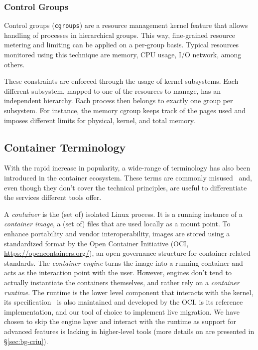 \subsubsection*{Control Groups}

Control groups (\texttt{cgroups}) are a resource management kernel feature that allows handling of processes in hierarchical groups.
This way, fine-grained resource metering and limiting can be applied on a per-group basis.
Typical resources monitored using this technique are memory, CPU usage, I/O network, among others.

These constraints are enforced through the usage of kernel subsystems.
Each different subsystem, mapped to one of the resources to manage, has an independent hierarchy.
Each process then belongs to exactly one group per subsystem.
For instance, the memory cgroup keeps track of the pages used and imposes different limits for physical, kernel, and total memory.

\subsection*{Container Terminology}

With the rapid increase in popularity, a wide-range of terminology has also been introduced in the container ecosystem.
These terms are commonly misused~\cite{McCarty2018} and, even though they don't cover the technical principles, are useful to differentiate the services different tools offer.

A \emph{container} is the (set of) isolated Linux process.
It is a running instance of a \emph{container image}, a (set of) files that are used locally as a mount point.
To enhance portability and vendor interoperability, images are stored using a standardized format by the Open Container Initiative (OCI, \url{https://opencontainers.org/}), an open governance structure for container-related standards.
The \emph{container engine} turns the image into a running container and acts as the interaction point with the user.
However, engines don't tend to actually instantiate the containers themselves, and rather rely on a \textit{container runtime}.
The runtime is the lower level component that interacts with the kernel, its specification~\cite{container-runtime-specification} is also maintained and developed by the OCI.
\runc is its reference implementation, and our tool of choice to implement live migration.
We have chosen to skip the engine layer and interact with the runtime as support for advanced \criu features is lacking in higher-level tools (more details on \criu are presented in \S\ref{sec:bg-criu}).

